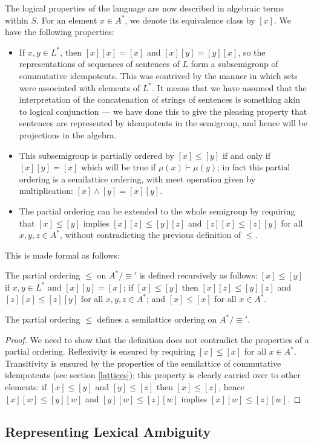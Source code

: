 The logical properties of the language are now described in algebraic terms within $S$. For an element $x \in A^*$, we denote its equivalence class by $[x]$. We have the following properties:
\begin{itemize}
\item If $x,y \in L^*$, then $[x][x] = [x]$ and $[x][y] = [y][x]$, so the representations of sequences of sentences of $L$ form a subsemigroup of commutative idempotents. This was contrived by the manner in which sets were associated with elements of $L^*$. It means that we have assumed that the interpretation of the concatenation of strings of sentences is something akin to logical conjunction --- we have done this to give the pleasing property that sentences are represented by idempotents in the semigroup, and hence will be projections in the algebra.
\item This subsemigroup is partially ordered by $[x] \le [y]$ if and only if $[x][y] = [x]$ which will be true if $\mu(x) \vdash \mu(y)$; in fact this partial ordering is a semilattice ordering, with meet operation given by multiplication: $[x]\land [y] = [x][y]$.
\item The partial ordering can be extended to the whole semigroup by requiring that $[x] \le [y]$ implies $[x][z] \le [y][z]$ and $[z][x] \le [z][y]$ for all $x,y,z \in A^*$, without contradicting the previous definition of $\le$.
\end{itemize}
This is made formal as follows:
\begin{defn}
The partial ordering $\le$ on $A^* / \equiv'$ is defined recursively as follows: $[x] \le [y]$ if $x, y \in L^*$ and $[x][y] = [x]$; if $[x] \le [y]$ then $[x][z] \le [y][z]$ and $[z][x] \le [z][y]$ for all $x,y,z\in A^*$; and $[x] \le [x]$ for all $x \in A^*$.
\end{defn}
\begin{prop}
The partial ordering $\le$ defines a semilattice ordering on $A^* / \equiv'$.
\end{prop}
\begin{proof}
We need to show that the definition does not contradict the properties of a partial ordering. Reflexivity is ensured by requiring $[x] \le [x]$ for all $x \in A^*$. Transitivity is ensured by the properties of the semilattice of commutative idempotents (see section \ref{lattices}); this property is clearly carried over to other elements: if $[x] \le [y]$ and $[y] \le [z]$ then $[x] \le [z]$, hence $[x][w] \le [y][w]$ and $[y][w] \le [z][w]$ implies $[x][w] \le [z][w]$.
\end{proof}

\subsection{Representing Lexical Ambiguity}


%
%

% 